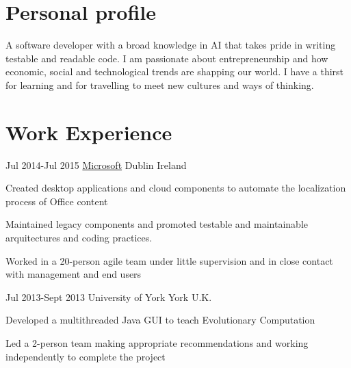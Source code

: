 \documentclass[10pt]{CurriculumVitae}
\begin{document}
  \makeheading


  \section{Personal profile}
   
    {
      A software developer with a broad knowledge in AI that takes pride in writing testable and readable code.
      I am passionate about entrepreneurship and how economic, social and technological trends are shapping our world. 
      I have a thirst for learning and for travelling to meet new cultures and ways of thinking. 
    }


  \section{Work Experience}
   
      {Jul 2014-Jul 2015}
      {\underline{Microsoft}} 
      {Dublin}
      {Ireland}
      {
         \item Created  desktop applications and cloud components to automate the localization
          process of Office content
         \item Maintained legacy components and promoted testable and maintainable 
         arquitectures and coding practices.
         \item Worked in a 20-person agile team under little supervision and 
         in close contact with management and end users
      }
    
      {Jul 2013-Sept 2013}
      {University of York}
      {York}
      {U.K.}
      {
         \item Developed a multithreaded Java GUI to teach Evolutionary Computation
         \item Led a 2-person team making appropriate recommendations and working independently to 
         complete the project 
      } 
\end{document}
